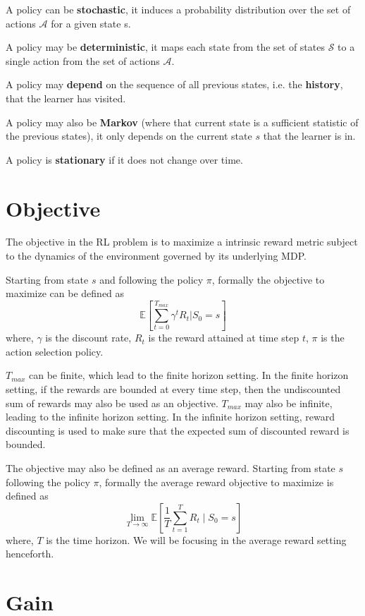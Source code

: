 A policy can be \textbf{stochastic}, it induces a probability distribution over the set of actions $\mathcal{A}$ for a given state s.

A policy may be \textbf{deterministic}, it maps each state from the set of states $\mathcal{S}$ to a single action from the set of actions $\mathcal{A}$.

A policy may \textbf{depend} on the sequence of all previous states, i.e. the \textbf{history}, that the learner has visited. 

A policy may also be \textbf{Markov} (where that current state is a sufficient statistic of the previous states), it only depends on the current state $s$ that the learner is in.

A policy is \textbf{stationary} if it does not change over time.

\section{Objective}

The objective in the RL problem is to maximize a intrinsic reward metric subject to the dynamics of the environment governed by its underlying MDP.

Starting from state $s$ and following the policy $\pi$, formally the objective to maximize can be defined as
$$\mathbb{E}\left[\sum_{t=0}^{T_{max}} \gamma^t R_t | S_0 = s\right]$$
where, $\gamma$ is the discount rate, $R_t$ is the reward attained at time step $t$, $\pi$ is the action selection policy.

$T_{max}$ can be finite, which lead to the finite horizon setting. 
In the finite horizon setting, if the rewards are bounded at every time step, then the undiscounted sum of rewards may also be used as an objective.
$T_{max}$ may also be infinite, leading to the infinite horizon setting.
In the infinite horizon setting, reward discounting is used to make sure that the expected sum of discounted reward is bounded.

The objective may also be defined as an average reward.
Starting from state $s$ following the policy $\pi$, formally the average reward objective to maximize is defined as
$$\lim_{T \to \infty} \mathbb{E}\left[\frac{1}{T} \sum_{t=1}^{T} R_t \mid S_0 = s\right]$$
where, $T$ is the time horizon.
We will be focusing in the average reward setting henceforth.

\section{Gain}

